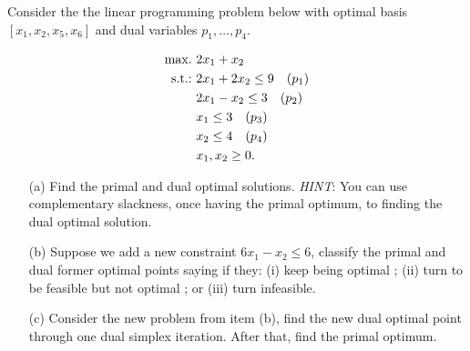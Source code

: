 Consider the the linear programming problem below with optimal basis $[x_1, x_2, x_5, x_6]$ and dual variables $p_1, \dots, p_4$.

\begin{align*}
	\mathop{\text{max.~}} & 2x_1 + x_2 \\
	\mathop{\text{s.t.:~}}   & 2x_1 + 2x_2 \le 9 \quad (p_1) \\
	      & 2x_1 - x_2 \le 3 \quad (p_2) \\
	      & x_1 \le 3 \quad (p_3) \\
	      & x_2 \le 4 \quad (p_4) \\
	      & x_1, x_2 \ge 0.
\end{align*}

\begin{itemize}
	\item[(a)] Find the primal and dual optimal solutions. \emph{HINT}: You can use complementary slackness, once having the primal optimum, to finding the dual optimal solution.
	\item[(b)] Suppose we add a new constraint $6x_1 - x_2 \leq 6$, classify the primal and dual former optimal points saying if they: (i) keep being optimal ; (ii) turn to be feasible but not optimal ; or (iii) turn infeasible.
	\item[(c)] Consider the new problem from item (b), find the new dual optimal point through one dual simplex iteration. After that, find the primal optimum.
\end{itemize}
